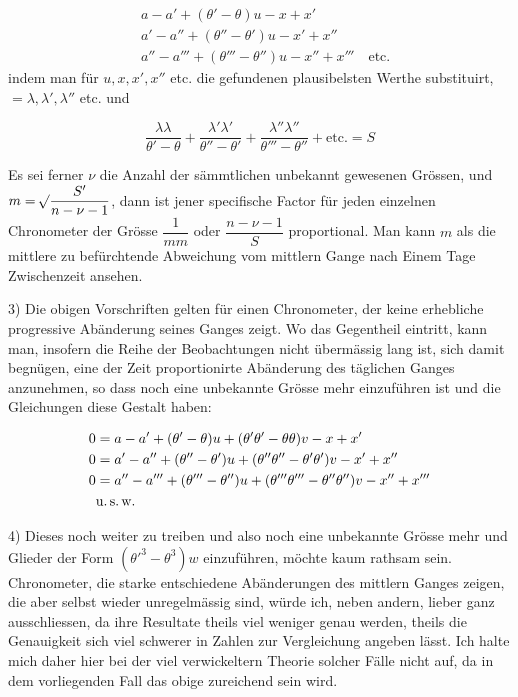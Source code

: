 \[
\begin{aligned}
&a-a'+(\theta'-\theta)u-x+x'\\
&a'-a''+(\theta''-\theta')u-x'+x''\\
&a''-a'''+(\theta'''-\theta'')u-x''+x''' \quad \text{etc.}
\end{aligned}
\]
\noindent indem man für $u, x, x', x''$ etc. die gefundenen plausibelsten Werthe substituirt,
$=\lambda, \lambda', \lambda''$ etc. und

\[
\frac{\lambda\lambda}{\theta'-\theta} + \frac{\lambda'\lambda'}{\theta''-\theta'} + \frac{\lambda''\lambda''}{\theta'''-\theta''} + \text{etc.} = S
\]

Es sei ferner $\nu$ die Anzahl der sämmtlichen unbekannt gewesenen Grössen, und
$m=\mathord{{}^{}\!\surd}\dfrac{S'}{n-\nu-1}$, dann ist jener specifische Factor für jeden einzelnen Chronometer
der Grösse $\dfrac{1}{mm}$ oder $\dfrac{n-\nu-1}{S}$ proportional. Man kann $m$ als die mittlere zu
befürchtende Abweichung vom mittlern Gange nach Einem Tage Zwischenzeit ansehen.

3) Die obigen Vorschriften gelten für einen Chronometer, der keine erhebliche
progressive Abänderung seines Ganges zeigt. Wo das Gegentheil eintritt, kann man,
insofern die Reihe der Beobachtungen nicht übermässig lang ist, sich damit begnügen,
eine der Zeit proportionirte Abänderung des täglichen Ganges anzunehmen, so dass noch
eine unbekannte Grösse mehr einzuführen ist und die Gleichungen diese Gestalt haben:

\[
\begin{aligned}
0 &= a-a'+(\theta'-\theta)u+(\theta'\theta'-\theta\theta)v-x+x'\\
0 &= a'-a''+(\theta''-\theta')u+(\theta''\theta''-\theta'\theta')v-x'+x''\\
0 &= a''-a'''+(\theta'''-\theta'')u+(\theta'''\theta'''-\theta''\theta'')v-x''+x'''\\
&\text{u.\,s.\,w.}
\end{aligned}
\]

4) Dieses noch weiter zu treiben und also noch eine unbekannte Grösse mehr und
Glieder der Form $(\theta'^3-\theta^3)w$ einzuführen, möchte kaum rathsam sein. Chronometer, die
starke entschiedene Abänderungen des mittlern Ganges zeigen, die aber selbst wieder
unregelmässig sind, würde ich, neben andern, lieber ganz ausschliessen, da ihre
Resultate theils viel weniger genau werden, theils die Genauigkeit sich viel schwerer in Zahlen zur Vergleichung angeben lässt. Ich halte mich daher hier bei
der viel verwickeltern Theorie solcher Fälle nicht auf, da in dem vorliegenden Fall das obige zureichend
sein wird.

